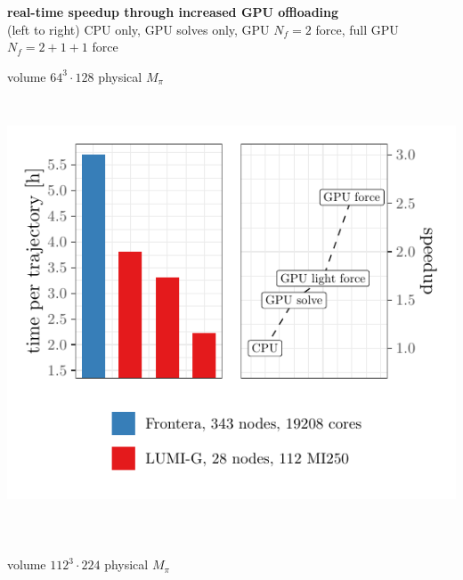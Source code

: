 \documentclass[a0,portrait]{a0poster}
\begin{document}
\begin{multicols}{2}
    \begin{center}
      \textbf{real-time speedup through increased GPU offloading}\\
      (left to right) CPU only, GPU solves only, GPU $N_f=2$ force, full GPU $N_f=2+1+1$ force
    \end{center}
    \vspace{0.5cm}
    \begin{minipage}{0.5\linewidth}
      \centering
      volume $64^3 \cdot 128$ \@ physical $M_\pi$
      \includegraphics[height=13.5cm,page=2]{data/tmLQCD_performance/quda_speedup}\\
    \end{minipage}
    \begin{minipage}{0.5\linewidth}
      \centering
      volume $112^3 \cdot 224$ \@ physical $M_\pi$

\end{minipage}
\end{multicols}
\end{document}
